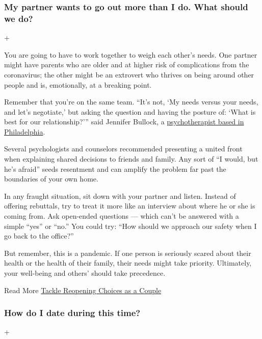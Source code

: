 \hypertarget{my-partner-wants-to-go-out-more-than-i-do-what-should-we-do}{%
\subsubsection{My partner wants to go out more than I do. What should we
do?}\label{my-partner-wants-to-go-out-more-than-i-do-what-should-we-do}}

+

You are going to have to work together to weigh each other's needs. One
partner might have parents who are older and at higher risk of
complications from the coronavirus; the other might be an extrovert who
thrives on being around other people and is, emotionally, at a breaking
point.

Remember that you're on the same team. ``It's not, `My needs versus your
needs, and let's negotiate,' but asking the question and having the
posture of: `What is best for our relationship?''' said Jennifer
Bullock, a \href{https://www.letsdevelopphilly.com/}{psychotherapist
based in Philadelphia}.

Several psychologists and counselors recommended presenting a united
front when explaining shared decisions to friends and family. Any sort
of ``I would, but he's afraid'' seeds resentment and can amplify the
problem far past the boundaries of your own home.

In any fraught situation, sit down with your partner and listen. Instead
of offering rebuttals, try to treat it more like an interview about
where he or she is coming from. Ask open-ended questions --- which can't
be answered with a simple ``yes'' or ``no.'' You could try: ``How should
we approach our safety when I go back to the office?''

But remember, this is a pandemic. If one person is seriously scared
about their health or the health of their family, their needs might take
priority. Ultimately, your well-being and others' should take
precedence.

Read More
\href{https://www.nytimes3xbfgragh.onion/2020/07/11/at-home/couples-coronavirus-pandemic.html}{Tackle
Reopening Choices as a Couple}

\hypertarget{how-do-i-date-during-this-time}{%
\subsubsection{How do I date during this
time?}\label{how-do-i-date-during-this-time}}

+

